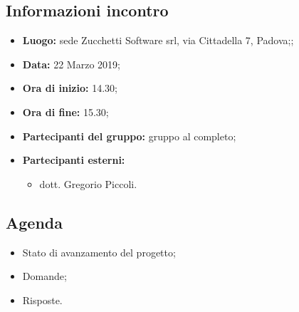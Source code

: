 \subsection{Informazioni incontro}
\begin{itemize}
	\item { \textbf{Luogo:} sede Zucchetti Software srl, via Cittadella 7, Padova;};
	\item { \textbf{Data:} 22 Marzo 2019};
	\item { \textbf{Ora di inizio:} 14.30};
	\item { \textbf{Ora di fine:} 15.30};
	\item { \textbf{Partecipanti del gruppo:} gruppo al completo};
	\item { \textbf{Partecipanti esterni:} 
	\begin{itemize}
			\item dott. Gregorio Piccoli.
	\end{itemize}}
\end{itemize}


\subsection{Agenda}
\begin{itemize}
	\item {Stato di avanzamento del progetto;}
	\item {Domande;}
	\item {Risposte.}
\end{itemize}

